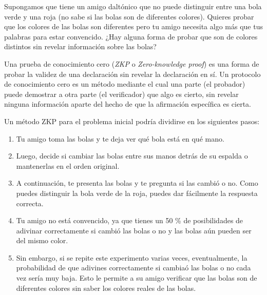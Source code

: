 Supongamos que tiene un amigo daltónico que no puede distinguir entre una bola verde y una roja (no sabe si las bolas son de diferentes colores). Quieres probar que los colores de las bolas son diferentes pero tu amigo necesita algo más que tus palabras para estar convencido. ¿Hay alguna forma de probar que son de colores distintos sin revelar información sobre las bolas?

Una prueba de conocimiento cero (\emph{ZKP} o \emph{Zero-knowledge proof}) es una forma de probar la validez de una declaración sin revelar la declaración en sí. Un protocolo de conocimiento cero es un método mediante el cual una parte (el probador) puede demostrar a otra parte (el verificador) que algo es cierto, sin revelar ninguna información aparte del hecho de que la afirmación específica es cierta.

Un método ZKP para el problema inicial podría dividirse en los siguientes pasos:
\begin{enumerate}
     \item Tu amigo toma las bolas y te deja ver qué bola está en qué mano.
     
     \item Luego, decide si cambiar las bolas entre sus manos detrás de su espalda o mantenerlas en el orden original.
     
     \item A continuación, te presenta las bolas y te pregunta si las cambió o no. Como puedes distinguir la bola verde de la roja, puedes dar fácilmente la respuesta correcta.
     
     \item Tu amigo no está convencido, ya que tienes un 50 \% de posibilidades de adivinar correctamente si cambió las bolas o no y las bolas aún pueden ser del mismo color.
     
     \item Sin embargo, si se repite este experimento varias veces, eventualmente, la probabilidad de que adivines correctamente si cambiaó las bolas o no cada vez sería muy baja. Esto le permite a su amigo verificar que las bolas son de diferentes colores sin saber los colores reales de las bolas.
\end{enumerate}

